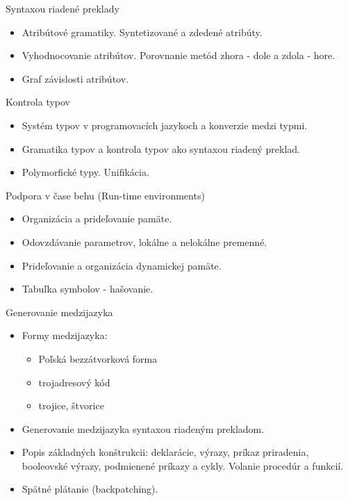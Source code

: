\documentclass[a4paper]{report}
\begin{document}
\begin{zadanie}{Syntaxou riadené preklady}
\begin{itemize}
 \item Atribútové gramatiky. Syntetizované a zdedené atribúty.
 \item Vyhodnocovanie atribútov. Porovnanie metód zhora - dole a zdola - hore.
 \item Graf závislosti atribútov.
\end{itemize}
\end{zadanie}

\begin{zadanie}{Kontrola typov}
\begin{itemize}
 \item Systém typov v programovacích jazykoch a konverzie medzi typmi.
 \item Gramatika typov a kontrola typov ako syntaxou riadený preklad.
 \item Polymorfické typy. Unifikácia.
\end{itemize}
\end{zadanie}

\begin{zadanie}{Podpora v čase behu (Run-time environments)}
\begin{itemize}
 \item Organizácia a prideľovanie pamäte.
 \item Odovzdávanie parametrov, lokálne a nelokálne premenné.
 \item Prideľovanie a organizácia dynamickej pamäte.
 \item Tabuľka symbolov - hašovanie.
\end{itemize}
\end{zadanie}

\begin{zadanie}{Generovanie medzijazyka}
\begin{itemize}
 \item Formy medzijazyka:
 \begin{itemize}
  \item Poľská bezzátvorková forma
  \item trojadresový kód
  \item trojice, štvorice
 \end{itemize}
 \item Generovanie medzijazyka syntaxou riadeným prekladom.
 \item Popis základných konštrukcii: deklarácie, výrazy, príkaz priradenia, booleovské výrazy, podmienené príkazy a cykly. Volanie procedúr a funkcií.
 \item Spätné plátanie (backpatching).
\end{itemize}
\end{zadanie}
\end{document}

